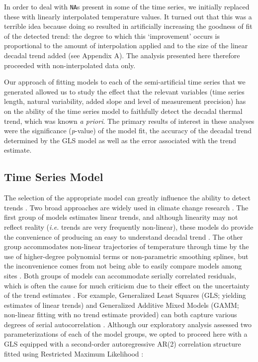 \documentclass[]{ametsoc}
\begin{document}
In order to deal with \texttt{NA}s present in some of the time series, we initially replaced these with linearly interpolated temperature values. It turned out that this was a terrible idea because doing so resulted in artificially increasing the goodness of fit of the detected trend: the degree to which this `improvement' occurs is proportional to the amount of interpolation applied and to the size of the linear decadal trend added (see Appendix A). The analysis presented here therefore proceeded with non-interpolated data only.

Our approach of fitting models to each of the semi-artificial time series that we generated allowed us to study the effect that the relevant variables (time series length, natural variability, added slope and level of measurement precision) has on the ability of the time series model to faithfully detect the decadal thermal trend, which was known \emph{a priori}. The primary results of interest in these analyses were the significance (\emph{p}-value) of the model fit, the accuracy of the decadal trend determined by the GLS model as well as the error associated with the trend estimate.

\subsection{Time Series Model}
The selection of the appropriate model can greatly influence the ability to detect trends \citet{Franzke2012}. Two broad approaches are widely used in climate change research \citep{Stocker2013}. The first group of models estimates linear trends, and although linearity may not reflect reality (\emph{i.e.} trends are very frequently non-linear), these models do provide the convenience of producing an easy to understand decadal trend \citep[\emph{e.g}. \SI{0.106}{\degreeCelsius}~dec$^{-1}$;][]{Wilks2011,Stocker2013}. The other group accommodates non-linear trajectories of temperature through time by the use of higher-degree polynomial terms or non-parametric smoothing splines, but the inconvenience comes from not being able to easily compare models among sites \citep{Scinocca2010,Wood2006}. Both groups of models can accommodate serially correlated residuals, which is often the cause for much criticism due to their effect on the uncertainty of the trend estimates \citep{vonStorch1999,Santer2008}. For example, Generalized Least Squares (GLS; yielding estimates of linear trends) and Generalized Additive Mixed Models (GAMM; non-linear fitting with no trend estimate provided) can both capture various degrees of serial autocorrelation \citep{Wood2006,pinheiro2006mixed}. Although our exploratory analysis assessed two parameterizations of each of the model groups, we opted to proceed here with a GLS equipped with a second-order autoregressive AR(2) correlation structure fitted using Restricted Maximum Likelihood \citep[REML;][]{pinheiro2006mixed}:
\end{document}
